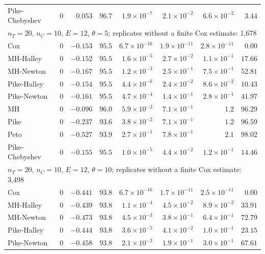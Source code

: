 \begin{landscape}
\begin{longtable}{lrrrrrrr}
Pike-Chebyshev & 0 & $0.053$ & $96.7$ & $1.9 \times 10^{-7}$ & $2.1 \times 10^{-2}$ & $6.6 \times 10^{-2}$ & $3.44$ \\
\multicolumn{8}{l}{$n_T = 20$, $n_C = 10$, $E = 12$, $\theta = 5$; replicates without a finite Cox estimate: 1,678} \\
Cox & 0 & $-0.153$ & $95.5$ & $6.7 \times 10^{-16}$ & $1.9 \times 10^{-11}$ & $2.8 \times 10^{-11}$ & $0.00$ \\
MH-Halley & 0 & $-0.152$ & $95.5$ & $1.6 \times 10^{-5}$ & $2.7 \times 10^{-2}$ & $1.1 \times 10^{-1}$ & $17.66$ \\
MH-Newton & 0 & $-0.167$ & $95.5$ & $1.2 \times 10^{-3}$ & $2.5 \times 10^{-1}$ & $7.5 \times 10^{-1}$ & $52.81$ \\
Pike-Halley & 0 & $-0.154$ & $95.5$ & $4.4 \times 10^{-6}$ & $2.4 \times 10^{-2}$ & $8.6 \times 10^{-2}$ & $10.43$ \\
Pike-Newton & 0 & $-0.161$ & $95.5$ & $4.7 \times 10^{-4}$ & $1.4 \times 10^{-1}$ & $2.8 \times 10^{-1}$ & $41.97$ \\
MH & 0 & $-0.096$ & $96.0$ & $5.9 \times 10^{-2}$ & $7.1 \times 10^{-1}$ & $1.2$ & $96.29$ \\
Pike & 0 & $-0.237$ & $93.6$ & $3.8 \times 10^{-2}$ & $7.1 \times 10^{-1}$ & $1.2$ & $96.59$ \\
Peto & 0 & $-0.527$ & $93.9$ & $2.7 \times 10^{-1}$ & $7.8 \times 10^{-1}$ & $2.1$ & $98.02$ \\
Pike-Chebyshev & 0 & $-0.155$ & $95.5$ & $1.0 \times 10^{-5}$ & $4.4 \times 10^{-2}$ & $1.2 \times 10^{-1}$ & $14.46$ \\
\multicolumn{8}{l}{$n_T = 20$, $n_C = 10$, $E = 12$, $\theta = 10$; replicates without a finite Cox estimate: 3,498} \\
Cox & 0 & $-0.441$ & $93.8$ & $6.7 \times 10^{-16}$ & $1.7 \times 10^{-11}$ & $2.5 \times 10^{-11}$ & $0.00$ \\
MH-Halley & 0 & $-0.439$ & $93.8$ & $1.1 \times 10^{-4}$ & $4.5 \times 10^{-2}$ & $8.9 \times 10^{-2}$ & $33.91$ \\
MH-Newton & 0 & $-0.473$ & $93.8$ & $4.5 \times 10^{-3}$ & $3.8 \times 10^{-1}$ & $6.4 \times 10^{-1}$ & $72.79$ \\
Pike-Halley & 0 & $-0.444$ & $93.8$ & $3.6 \times 10^{-5}$ & $4.1 \times 10^{-2}$ & $1.0 \times 10^{-1}$ & $23.15$ \\
Pike-Newton & 0 & $-0.458$ & $93.8$ & $2.1 \times 10^{-3}$ & $1.9 \times 10^{-1}$ & $3.0 \times 10^{-1}$ & $67.61$ \\

\end{longtable}
\end{landscape}
